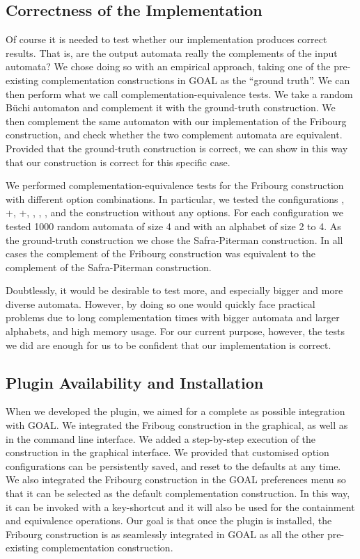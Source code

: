 \subsection{Correctness of the Implementation}
Of course it is needed to test whether our implementation produces correct results. That is, are the output automata really the complements of the input automata? We chose doing so with an empirical approach, taking one of the pre-existing complementation constructions in GOAL as the ``ground truth''. We can then perform what we call complementation-equivalence tests. We take a random Büchi automaton and complement it with the ground-truth construction. We then complement the same automaton with our implementation of the Fribourg construction, and check whether the two complement automata are equivalent. Provided that the ground-truth construction is correct, we can show in this way that our construction is correct for this specific case.

We performed complementation-equivalence tests for the Fribourg construction with different option combinations. In particular, we tested the configurations , +, +, , , , and the construction without any options. For each configuration we tested 1000 random automata of size 4 and with an alphabet of size 2 to 4. As the ground-truth construction we chose the Safra-Piterman construction. In all cases the complement of the Fribourg construction was equivalent to the complement of the Safra-Piterman construction.

Doubtlessly, it would be desirable to test more, and especially bigger and more diverse automata. However, by doing so one would quickly face practical problems due to long complementation times with bigger automata and larger alphabets, and high memory usage. For our current purpose, however, the tests we did are enough for us to be confident that our implementation is correct.


\subsection{Plugin Availability and Installation}
When we developed the plugin, we aimed for a complete as possible integration with GOAL. We integrated the Friboug construction in the graphical, as well as in the command line interface. We added a step-by-step execution of the construction in the graphical interface. We provided that customised option configurations can be persistently saved, and reset to the defaults at any time. We also integrated the Fribourg construction in the GOAL preferences menu so that it can be selected as the default complementation construction. In this way, it can be invoked with a key-shortcut and it will also be used for the containment and equivalence operations. Our goal is that once the plugin is installed, the Fribourg construction is as seamlessly integrated in GOAL as all the other pre-existing complementation construction.

